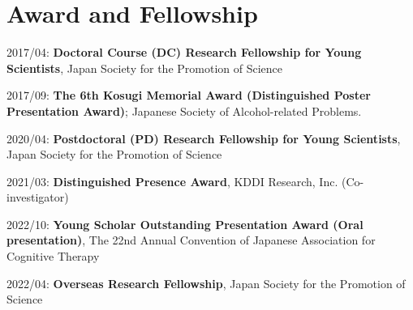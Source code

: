 \documentclass[a4paper]{article}
\begin{document}
\section{Award and Fellowship}
	\begin{description}
		\item 2017/04: \textbf{Doctoral Course (DC) Research Fellowship for Young Scientists}, Japan Society for the Promotion of Science
		\item 2017/09: \textbf{The 6th Kosugi Memorial Award (Distinguished Poster Presentation Award)}; Japanese Society of Alcohol-related Problems.
		\item 2020/04: \textbf{Postdoctoral (PD) Research Fellowship for Young Scientists}, Japan Society for the Promotion of Science
		\item 2021/03: \textbf{Distinguished Presence Award}, KDDI Research, Inc. (Co-investigator)
		\item 2022/10: \textbf{Young Scholar Outstanding Presentation Award (Oral presentation)}, The 22nd Annual Convention of Japanese Association for Cognitive Therapy
		\item 2022/04: \textbf{Overseas Research Fellowship}, Japan Society for the Promotion of Science
	\end{description}
	
\end{document}
